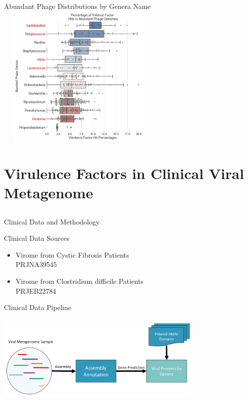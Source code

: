 \documentclass[11pt]{beamer}
\begin{document}
	\begin{frame}{Abundant Phage Distributions by Genera Name}
	\centering
	\includegraphics[height=7cm, width=8cm]{Top_Phages_Plots.jpg}
	
	\end{frame}
	
	

\section{Virulence Factors in Clinical Viral Metagenome}
\subsection{}

	\begin{frame}{Clinical Data and Methodology}
	\begin{block}{Clinical Data Sources}
	\begin{itemize}
	\item \large{Virome from Cystic Fibrosis Patients} \\ \tiny{PRJNA39545}
	\item \large{Virome from Clostridium difficile Patients} \\ \tiny{PRJEB22784}
	\end{itemize}
	\end{block}
	\begin{block}{Clinical Data Pipeline}
	\centering
	\includegraphics[height=5cm, width=10cm]{Clinical_Pipeline.png}
	\end{block}
	\end{frame}
	
\end{document}

